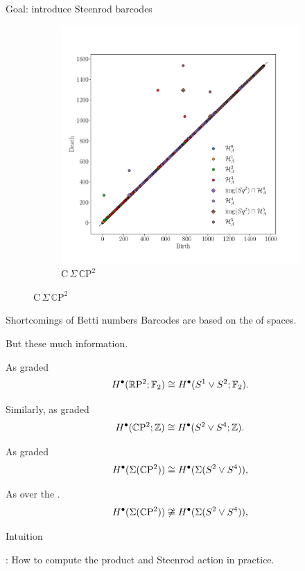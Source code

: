 \begin{frame}{Goal: introduce Steenrod barcodes}
\begin{figure}
\begin{subfigure}[b]{0.49\textwidth}
			\includegraphics[width=\textwidth]{aux/cp2.pdf}
			\caption{$\mathrm C\,\Sigma\,\mathbb C \mathrm P^2$}
			\label{f:cp2}
		\end{subfigure}
	\end{figure}
\end{frame}

\begin{frame}{Shortcomings of Betti numbers}
	\pause
	Barcodes are based on the  of spaces.

	\pause\bigskip
	But these  much information.

	\pause\bigskip
	As graded 
	\[
	H^\bullet(\mathbb{R} \mathrm{P}^2; {\mathbb{F}_2}) \cong H^\bullet(S^1 \vee S^2; {\mathbb{F}_2}).
	\]

	\pause
	Similarly, as graded 
	\[
	H^\bullet(\mathbb{C} \mathrm{P}^2; \mathbb{Z}) \cong H^\bullet(S^2 \vee S^4; \mathbb{Z}).
	\]

	\pause
	As graded 
	\[
	H^\bullet(\Sigma(\mathbb{C} \mathrm{P}^2)) \cong H^\bullet(\Sigma(S^2 \vee S^4)),
	\]

	\pause\medskip
	As  over the .
	\[
	H^\bullet(\Sigma(\mathbb{C} \mathrm{P}^2)) \not\cong H^\bullet(\Sigma(S^2 \vee S^4)),
	\]
\end{frame}

\begin{frame}{Intuition}
	\pause
	\begin{figure}
	\end{figure}

	\pause\bigskip
	: How to compute the product and Steenrod action in practice.
\end{frame}

